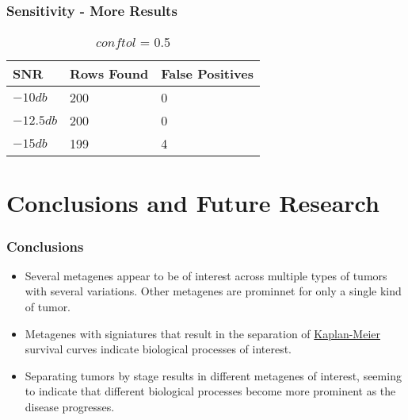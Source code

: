 \documentclass[
	11pt, %
]{beamer}
\begin{document}
\begin{frame}
	\frametitle{Sensitivity - More Results}
	
	\begin{table}
		\begin{tabular}{l l l}
			\toprule
			\textbf{SNR} & \textbf{Rows Found} & \textbf{False Positives}\\
			\midrule
			$-10db$ & 200 & 0 \\
			$-12.5db$ & 200 & 0 \\
			$-15db$ & 199 & 4 \\
			\bottomrule
		\end{tabular}
		\caption{$conftol$ = 0.5}
	\end{table}
\end{frame}


\section{Conclusions and Future Research}

\begin{frame}
    \frametitle{Conclusions}
    \begin{itemize}
        \item Several metagenes appear to be of interest across multiple types of tumors with several variations. Other metagenes are prominnet for only a single kind of tumor.
        \pause
        \item Metagenes with signiatures that result in the separation of \href{https://www.mygreatlearning.com/blog/kaplan-meier-curve-explained}{Kaplan-Meier} survival curves indicate biological processes of interest.
        \pause
        \item Separating tumors by stage results in different metagenes of interest, seeming to indicate that different biological processes become more prominent as the disease progresses.
    \end{itemize}
\end{frame}
\end{document}
